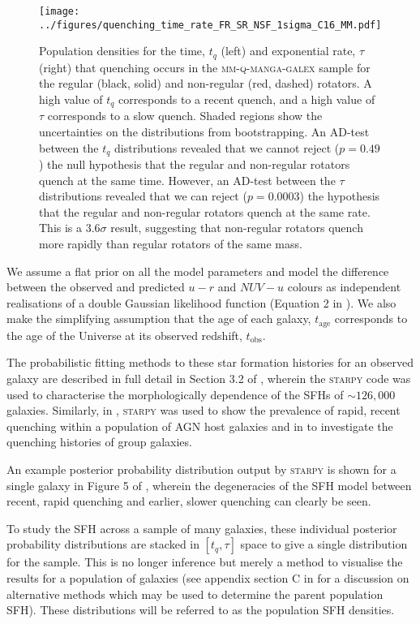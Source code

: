 \documentclass[useAMS,usenatbib]{mn2e}
\begin{document}
\begin{figure*}
\centering
\texttt{[image: ../figures/quenching\_time\_rate\_FR\_SR\_NSF\_1sigma\_C16\_MM.pdf]}
\caption{Population densities for the time, $t_q$ (left) and exponential rate, $\tau$ (right) that quenching occurs in the \textsc{mm-q-manga-galex} sample for the regular (black, solid) and non-regular (red, dashed) rotators. A high value of $t_q$ corresponds to a recent quench, and a high value of $\tau$ corresponds to a slow quench. Shaded regions show the uncertainties on the distributions from bootstrapping. An AD-test between the $t_q$ distributions revealed that we cannot reject ($p=0.49$) the null hypothesis that the regular and non-regular rotators quench at the same time. However, an AD-test between the $\tau$ distributions revealed that we can reject ($p=0.0003$) the hypothesis that the regular and non-regular rotators quench at the same rate. This is a $3.6\sigma$ result, suggesting that non-regular rotators quench more rapidly than regular rotators of the same mass.}
\label{fig:popfrvsr}
\end{figure*}

We assume a flat prior on all the model parameters and model the difference between the observed and predicted $u-r$ and $NUV-u$ colours as independent realisations of a double Gaussian likelihood function (Equation 2 in \citealt{smethurst15}). We also make the simplifying assumption that the age of each galaxy, $t_\mathrm{age}$ corresponds to the age of the Universe at its observed redshift, $t_\mathrm{obs}$.

The probabilistic fitting methods to these star formation histories for an observed galaxy are described in full detail in Section 3.2 of \cite{smethurst15}, wherein the \textsc{starpy} code was used to characterise the morphologically dependence of the SFHs of $\sim126,000$ galaxies. Similarly, in \cite{smethurst16}, \textsc{starpy} was used to show the prevalence of rapid, recent quenching within a population of AGN host galaxies and in \cite{smethurst17} to investigate the quenching histories of group galaxies. 


An example posterior probability distribution output by \textsc{starpy} is shown for a single galaxy in Figure 5 of \cite{smethurst15}, wherein the degeneracies of the SFH model between recent, rapid quenching and earlier, slower quenching can clearly be seen. 

To study the SFH across a sample of many galaxies, these individual posterior probability distributions are stacked in $[t_q, \tau]$ space to give a single distribution for the sample. This is no longer inference but merely a method to visualise the results for a population of galaxies (see appendix section C in \citealt{smethurst16} for a discussion on alternative methods which may be used to determine the parent population SFH). These distributions will be referred to as the population SFH densities.
\end{document}
